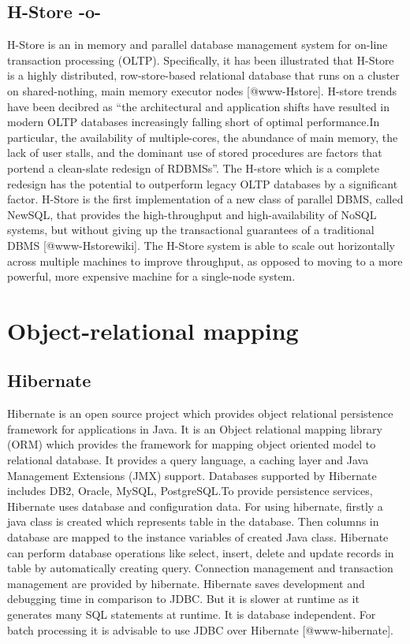 \subsection{H-Store -o-}

H-Store is an in memory and parallel database management system for
on-line transaction processing (OLTP). Specifically, it has been
illustrated that H-Store is a highly distributed, row-store-based
relational database that runs on a cluster on shared-nothing, main
memory executor nodes [@www-Hstore].  H-store trends have been
decibred as ``the architectural and application shifts have resulted
in modern OLTP databases increasingly falling short of optimal
performance.In particular, the availability of multiple-cores, the
abundance of main memory, the lack of user stalls, and the dominant
use of stored procedures are factors that portend a clean-slate
redesign of RDBMSs''\cite{kallman2008}.  The H-store which is a
complete redesign has the potential to outperform legacy OLTP
databases by a significant factor.  H-Store is the first
implementation of a new class of parallel DBMS, called NewSQL, that
provides the high-throughput and high-availability of NoSQL systems,
but without giving up the transactional guarantees of a traditional
DBMS [@www-Hstorewiki]. The H-Store system is able to scale out
horizontally across multiple machines to improve throughput, as
opposed to moving to a more powerful, more expensive machine for a
single-node system.



\section{Object-relational mapping}

\subsection{Hibernate}

Hibernate is an open source project which provides object relational
persistence framework for applications in Java. It is an Object
relational mapping library (ORM) which provides the framework for
mapping object oriented model to relational database. It provides a
query language, a caching layer and Java Management Extensions (JMX)
support. Databases supported by Hibernate includes DB2, Oracle, MySQL,
PostgreSQL.To provide persistence services, Hibernate uses database
and configuration data. For using hibernate, firstly a java class is
created which represents table in the database. Then columns in
database are mapped to the instance variables of created Java
class. Hibernate can perform database operations like select, insert,
delete and update records in table by automatically creating
query. Connection management and transaction management are provided
by hibernate.  Hibernate saves development and debugging time in
comparison to JDBC.  But it is slower at runtime as it generates many
SQL statements at runtime. It is database independent. For batch
processing it is advisable to use JDBC over
Hibernate [@www-hibernate].

